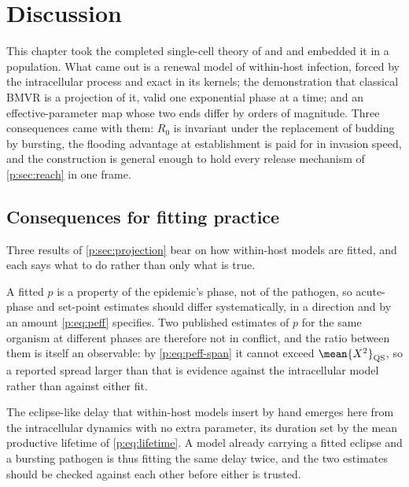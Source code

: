 
\section{Discussion}
\label{p:sec:discussion}

This chapter took the completed single-cell theory of \ChCore{} and
\ChDist{} and embedded it in a population. What came out is a renewal model
of within-host infection, forced by the intracellular process and exact in
its kernels; the demonstration that classical BMVR is a
projection of it, valid one exponential phase at a time; and an
effective-parameter map whose two ends differ by orders of magnitude. Three
consequences came with them: $R_0$ is invariant under the replacement of
budding by bursting, the flooding advantage at establishment is paid for in
invasion speed, and the construction is general enough to hold every release
mechanism of \cref{p:sec:reach} in one frame.

\subsection{Consequences for fitting practice}
\label{p:sec:fitting-consequences}

Three results of \cref{p:sec:projection} bear on how within-host models are
fitted, and each says what to do rather than only what is true.

A fitted $p$ is a property of the epidemic's phase, not of the pathogen, so
acute-phase and set-point estimates should differ systematically, in a
direction and by an amount \cref{p:eq:peff} specifies. Two published
estimates of $p$ for the same organism at different phases are therefore not
in conflict, and the ratio between them is itself an observable: by
\cref{p:eq:peff-span} it cannot exceed $\mean{X^2}_{\rm QS}$, so a reported
spread larger than that is evidence against the intracellular model rather
than against either fit.

The eclipse-like delay that within-host models insert by hand emerges here
from the intracellular dynamics with no extra parameter, its duration set by
the mean productive lifetime of \cref{p:eq:lifetime}. A model already
carrying a fitted eclipse and a bursting pathogen is thus fitting the same
delay twice, and the two estimates should be checked against each other
before either is trusted.


